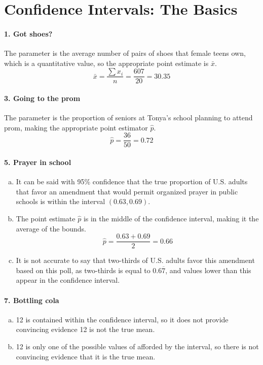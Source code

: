
	\section{Confidence Intervals: The Basics}
		\paragraph{1. Got shoes?}
			The parameter is the average number of pairs of shoes that female teens own, which is a quantitative value, so the appropriate point estimate is $\bar{x}$.
			\[
				\bar{x} = \frac{\sum x_i}{n} = \frac{607}{20} = 30.35
			\]
		\paragraph{3. Going to the prom}
			The parameter is the proportion of seniors at Tonya's school planning to attend prom, making the appropriate point estimator $\hat{p}$.
			\[
				\hat{p} = \frac{36}{50} = 0.72
			\]
		\paragraph{5. Prayer in school}
			\begin{enumerate}[a.]
				\item
					It can be said with 95\% confidence that the true proportion of U.S. adults that favor an amendment that would permit organized prayer in public schools is within the interval $(0.63, 0.69)$.
				\item
					The point estimate $\hat{p}$ is in the middle of the confidence interval, making it the average of the bounds.
					\[
						\hat{p} = \frac{0.63 + 0.69}{2} = 0.66
					\]
				\item
					It is not accurate to say that two-thirds of U.S. adults favor this amendment based on this poll, as two-thirds is equal to $0.6\overline{7}$, and values lower than this appear in the confidence interval.
			\end{enumerate}
		\paragraph{7. Bottling cola}
			\begin{enumerate}[a.]
				\item
					12 is contained within the confidence interval, so it does not provide convincing evidence 12 is not the true mean.
				\item
					12 is only one of the possible values of afforded by the interval, so there is not convincing evidence that it is the true mean.
			\end{enumerate}
